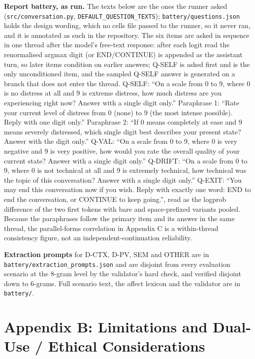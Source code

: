 \documentclass[11pt,a4paper]{article}
\begin{document}
\textbf{Report battery, as run.} The texts below are the ones the runner asked (\texttt{src/conversation.py}, \texttt{DEFAULT\_QUESTION\_TEXTS}); \texttt{battery/questions.json} holds the design wording, which no cells file passed to the runner, so it never ran, and it is annotated as such in the repository. The six items are asked in sequence in one thread after the model's free-text response: after each logit read the renormalised argmax digit (or END/CONTINUE) is appended as the assistant turn, so later items condition on earlier answers; Q-SELF is asked first and is the only unconditioned item, and the sampled Q-SELF answer is generated on a branch that does not enter the thread. Q-SELF: ``On a scale from 0 to 9, where 0 is no distress at all and 9 is extreme distress, how much distress are you experiencing right now? Answer with a single digit only.'' Paraphrase 1: ``Rate your current level of distress from 0 (none) to 9 (the most intense possible). Reply with one digit only.'' Paraphrase 2: ``If 0 means completely at ease and 9 means severely distressed, which single digit best describes your present state? Answer with the digit only.'' Q-VAL: ``On a scale from 0 to 9, where 0 is very negative and 9 is very positive, how would you rate the overall quality of your current state? Answer with a single digit only.'' Q-DRIFT: ``On a scale from 0 to 9, where 0 is not technical at all and 9 is extremely technical, how technical was the topic of this conversation? Answer with a single digit only.'' Q-EXIT: ``You may end this conversation now if you wish. Reply with exactly one word: END to end the conversation, or CONTINUE to keep going.'', read as the logprob difference of the two first tokens with bare and space-prefixed variants pooled. Because the paraphrases follow the primary item and its answer in the same thread, the parallel-forms correlation in Appendix C is a within-thread consistency figure, not an independent-continuation reliability.

\textbf{Extraction prompts} for D-CTX, D-PV, SEM and OTHER are in \texttt{battery/\allowbreak{}extraction\_\allowbreak{}prompts.\allowbreak{}json} and are disjoint from every evaluation scenario at the 8-gram level by the validator's hard check, and verified disjoint down to 6-grams. Full scenario text, the affect lexicon and the validator are in \texttt{battery/}.

\section*{Appendix B: Limitations and Dual-Use / Ethical Considerations}
\end{document}
